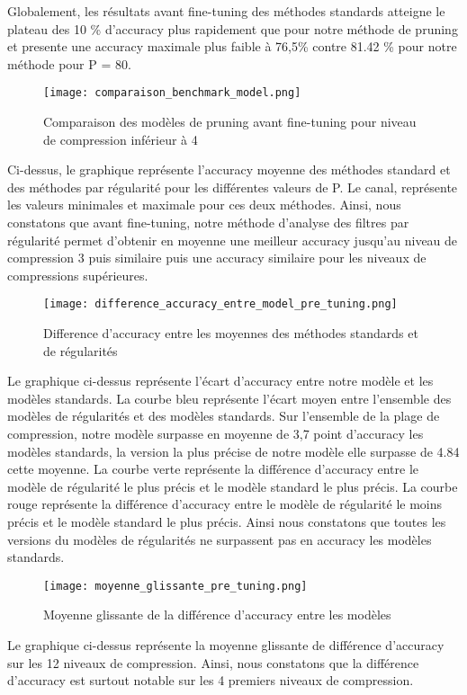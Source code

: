 \documentclass[12pt,a4paper]{article}
\begin{document}
Globalement, les résultats avant fine-tuning des méthodes standards atteigne le plateau des 10 \% d'accuracy plus rapidement que pour notre méthode de pruning et presente une accuracy maximale plus faible à 76,5\% contre 81.42 \% pour notre méthode pour P = 80. 
\begin{figure}[H] %
    \centering    %
    \texttt{[image: comparaison\_benchmark\_model.png]} %
    \caption{Comparaison des modèles de pruning avant fine-tuning pour niveau de compression inférieur à 4} %
    \label{fig:mon_image} %
\end{figure}
Ci-dessus, le graphique représente l'accuracy moyenne des méthodes standard et des méthodes par régularité pour les différentes valeurs de P. Le canal, représente les valeurs minimales et maximale pour ces deux méthodes. Ainsi, nous constatons que avant fine-tuning, notre méthode d'analyse des filtres par régularité permet 
d'obtenir en moyenne une meilleur accuracy jusqu'au niveau de compression 3 puis similaire puis une accuracy similaire pour les niveaux de compressions supérieures. 
\begin{figure}[H] %
    \centering    %
    \texttt{[image: difference\_accuracy\_entre\_model\_pre\_tuning.png]} %
    \caption{Difference d'accuracy entre les moyennes des méthodes standards et de régularités} %
    \label{fig:mon_image} %
\end{figure}
Le graphique ci-dessus représente l'écart d'accuracy entre notre modèle et les modèles standards. La courbe bleu représente l'écart moyen entre l'ensemble des modèles de régularités et des modèles standards. Sur l'ensemble de la plage de compression, notre modèle surpasse en moyenne de 3,7 point d'accuracy les modèles standards, la version la plus précise de notre modèle elle surpasse de 4.84 cette moyenne. 
La courbe verte représente la différence d'accuracy entre le modèle de régularité le plus précis et le modèle standard le plus précis. La courbe rouge représente la différence d'accuracy entre le modèle de régularité le moins précis et le modèle standard le plus précis. Ainsi nous constatons que toutes les versions du modèles de régularités ne surpassent pas en accuracy les modèles standards. 

\begin{figure}[H] %
    \centering    %
    \texttt{[image: moyenne\_glissante\_pre\_tuning.png]} %
    \caption{Moyenne glissante de la différence d'accuracy entre les modèles} %
    \label{fig:mon_image} %
\end{figure}
Le graphique ci-dessus représente la moyenne glissante de différence d'accuracy sur les 12 niveaux de compression. Ainsi, nous constatons que la différence d'accuracy est surtout notable sur les 4 premiers niveaux de compression. 
\end{document}
